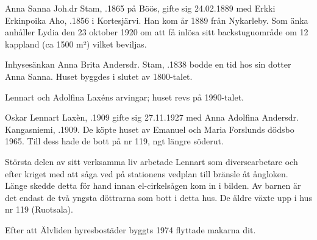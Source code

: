 Anna Sanna Joh.dr Stam, .1865 på Böös, gifte sig 24.02.1889 med Erkki Erkinpoika Aho, .1856 i Kortesjärvi. Han kom år 1889 från Nykarleby. Som änka anhåller Lydia den 23 oktober 1920 om att få inlösa sitt backstuguområde om 12 kappland (ca 1500 m²) vilket beviljas.
\begin{jhchildren}
  \item {}
  \item {}
  \item {}
  \item {}
\end{jhchildren}
Inhysesänkan Anna Brita Andersdr. Stam, .1838 bodde en tid hos sin dotter Anna Sanna. Huset byggdes i slutet av 1800-talet.




Lennart och Adolfina Laxéns arvingar; huset revs på 1990-talet.

Oskar Lennart Laxèn, .1909 gifte sig 27.11.1927 med Anna Adolfina Andersdr. Kangasniemi, .1909. De köpte huset av Emanuel och Maria Forslunds dödsbo 1965. Till dess hade de bott på nr 119, ngt längre söderut.

Största delen av sitt verksamma liv arbetade Lennart som diversearbetare och efter kriget med att såga ved på stationens vedplan till bränsle åt ångloken. Länge skedde detta för hand innan el-cirkelsågen kom in i bilden. Av barnen är det endast de två yngsta döttrarna som bott i detta hus. De äldre växte upp i hus nr 119 (Ruotsala).
\begin{jhchildren}
  \item {}
  \item {}
  \item {}
  \item {}
  \item {}
  \item {}
  \item {}
\end{jhchildren}
Efter att Älvliden hyresbostäder byggts 1974 flyttade makarna dit.

